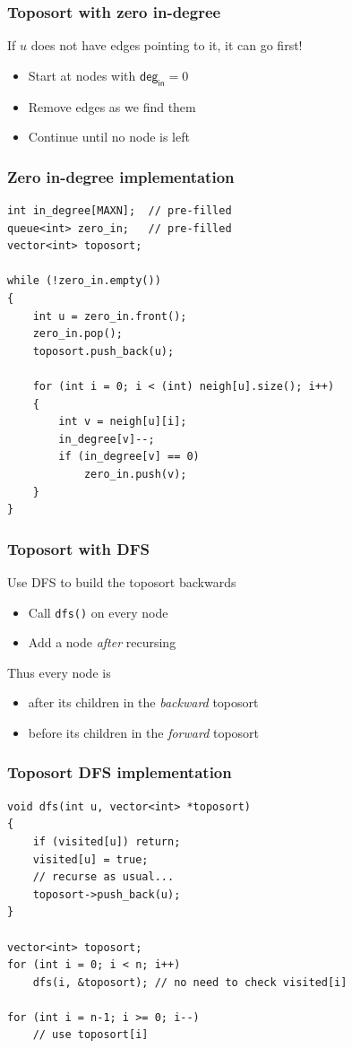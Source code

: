 \documentclass[12pt]{beamer}
\begin{document}
\begin{frame}
\frametitle{Toposort with zero in-degree}
If $u$ does not have edges pointing to it, it can go first!
\begin{itemize}
\item Start at nodes with $\mathsf{deg}_\mathsf{in} = 0$
\item Remove edges as we find them
\item Continue until no node is left
\end{itemize}
\end{frame}

\begin{frame}[fragile]
\frametitle{Zero in-degree implementation}
\begin{lstlisting}
int in_degree[MAXN];  // pre-filled
queue<int> zero_in;   // pre-filled
vector<int> toposort;

while (!zero_in.empty())
{
    int u = zero_in.front();
    zero_in.pop();
    toposort.push_back(u);
    
    for (int i = 0; i < (int) neigh[u].size(); i++)
    {
        int v = neigh[u][i];
        in_degree[v]--;
        if (in_degree[v] == 0)
            zero_in.push(v);
    }
}
\end{lstlisting}
\end{frame}

\begin{frame}
\frametitle{Toposort with DFS}
Use DFS to build the toposort backwards
\begin{itemize}
\item Call \texttt{dfs()} on every node
\item Add a node \emph{after} recursing
\end{itemize}
Thus every node is
\begin{itemize}
\item after its children in the \emph{backward} toposort
\item before its children in the \emph{forward} toposort
\end{itemize}
\end{frame}

\begin{frame}[fragile]
\frametitle{Toposort DFS implementation}
\begin{lstlisting}
void dfs(int u, vector<int> *toposort)
{
    if (visited[u]) return;
    visited[u] = true;
    // recurse as usual...
    toposort->push_back(u);
}

vector<int> toposort;
for (int i = 0; i < n; i++)
    dfs(i, &toposort); // no need to check visited[i]

for (int i = n-1; i >= 0; i--)
    // use toposort[i]
\end{lstlisting}
\end{frame}
\end{document}
